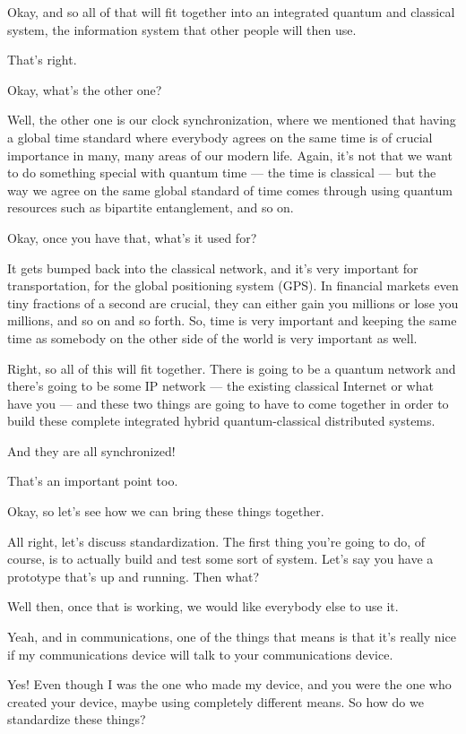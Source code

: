 \rrr Okay, and so all of that will fit together into an integrated quantum and classical system, the information system that other people will then use.

\mmm That's right.

\rrr Okay, what's the other one?

\mmm Well, the other one is our clock synchronization, where we mentioned that having a global time standard where everybody agrees on the same time is of crucial importance in many, many areas of our modern life. Again, it's not that we want to do something special with quantum time --- the time is classical --- but the way we agree on the same global standard of time comes through using quantum resources such as bipartite entanglement, and so on.

\rrr Okay, once you have that, what's it used for?

\mmm It gets bumped back into the classical network, and it's very important for transportation, for the global positioning system (GPS). In financial markets even tiny fractions of a second are crucial, they can either gain you millions or lose you millions, and so on and so forth. So, time is very important and keeping the same time as somebody on the other side of the world is very important as well.

\rrr Right, so all of this will fit together. There is going to be a quantum network and there's going to be some IP network --- the existing classical Internet or what have you --- and these two things are going to have to come together in order to build these complete integrated hybrid quantum-classical distributed systems.

\mmm And they are all synchronized!

\rrr That's an important point too.

\mmm Okay, so let's see how we can bring these things together.

\rrr All right, let's discuss standardization. The first thing you're going to do, of course, is to actually build and test some sort of system. Let's say you have a prototype that's up and running. Then what?

\mmm Well then, once that is working, we would like everybody else to use it.

\rrr Yeah, and in communications, one of the things that means is that it's really nice if my communications device will talk to your communications device.

\mmm Yes! Even though I was the one who made my device, and you were the one who created your device, maybe using completely different means. So how do we standardize these things?

